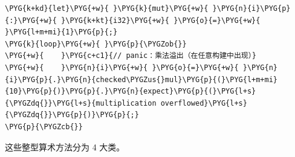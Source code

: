 \begin{Verbatim}[commandchars=\\\{\},breaklines=true,breakanywhere=true,fontsize=\codefont,xleftmargin=17bp]
\PYG{k+kd}{let}\PYG{+w}{ }\PYG{k}{mut}\PYG{+w}{ }\PYG{n}{i}\PYG{p}{:}\PYG{+w}{ }\PYG{k+kt}{i32}\PYG{+w}{ }\PYG{o}{=}\PYG{+w}{ }\PYG{l+m+mi}{1}\PYG{p}{;}
\PYG{k}{loop}\PYG{+w}{ }\PYG{p}{\PYGZob{}}
\PYG{+w}{    }\PYG{c+c1}{// panic：乘法溢出（在任意构建中出现）}
\PYG{+w}{    }\PYG{n}{i}\PYG{+w}{ }\PYG{o}{=}\PYG{+w}{ }\PYG{n}{i}\PYG{p}{.}\PYG{n}{checked\PYGZus{}mul}\PYG{p}{(}\PYG{l+m+mi}{10}\PYG{p}{)}\PYG{p}{.}\PYG{n}{expect}\PYG{p}{(}\PYG{l+s}{\PYGZdq{}}\PYG{l+s}{multiplication overflowed}\PYG{l+s}{\PYGZdq{}}\PYG{p}{)}\PYG{p}{;}
\PYG{p}{\PYGZcb{}}
\end{Verbatim}

这些整型算术方法分为 4 大类。

